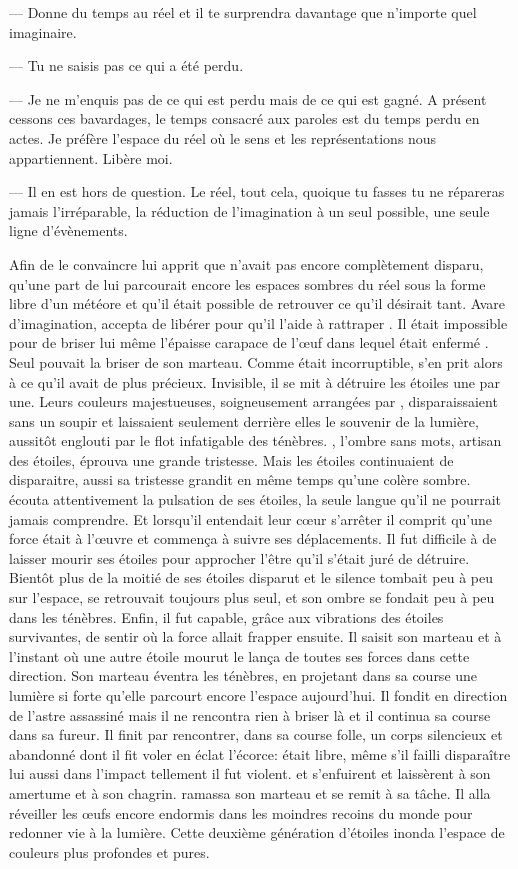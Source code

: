 --- Donne du temps au réel et il te surprendra davantage que n'importe quel imaginaire.

--- Tu ne saisis pas ce qui a été perdu. 

--- Je ne m'enquis pas de ce qui est perdu mais de ce qui est gagné. A présent cessons ces bavardages, le temps consacré aux paroles est du temps perdu en actes. Je préfère l'espace du réel où le sens et les représentations nous appartiennent. Libère moi.

--- Il en est hors de question. Le réel, tout cela, quoique tu fasses tu ne répareras jamais l'irréparable, la réduction de l'imagination à un seul possible, une seule ligne d'évènements.

Afin de le convaincre \Ogo lui apprit que \Mey n'avait pas encore complètement disparu, qu'une part de lui parcourait encore les espaces sombres du réel sous la forme libre d'un météore et qu'il était possible de retrouver ce qu'il désirait tant. Avare d'imagination, \Shuru accepta de libérer \Ogo pour qu'il l'aide à rattraper \Drisst. Il était impossible pour \Shuru de briser lui même l'épaisse carapace de l'œuf dans lequel était enfermé \Ogo. Seul \Carac pouvait la briser de son marteau. Comme \Carac était incorruptible, \Shuru s'en prit alors à ce qu'il avait de plus précieux. Invisible, il se mit à détruire les étoiles une par une. Leurs couleurs majestueuses, soigneusement arrangées par \Carac, disparaissaient sans un soupir et laissaient seulement derrière elles le souvenir de la lumière, aussitôt englouti par le flot infatigable des ténèbres. \Carac, l'ombre sans mots, artisan des étoiles, éprouva une grande tristesse. Mais les étoiles continuaient de disparaitre, aussi sa tristesse grandit en même temps qu'une colère sombre. \Carac écouta attentivement la pulsation de ses étoiles, la seule langue qu'il ne pourrait jamais comprendre. Et lorsqu'il entendait leur cœur s'arrêter il comprit qu'une force était à l'œuvre et commença à suivre ses déplacements. Il fut difficile à \Carac de laisser mourir ses étoiles pour approcher l'être qu'il s'était juré de détruire. Bientôt plus de la moitié de ses étoiles disparut et le silence tombait peu à peu sur l'espace, \Carac se retrouvait toujours plus seul, et son ombre se fondait peu à peu dans les ténèbres. Enfin, il fut capable, grâce aux vibrations des étoiles survivantes, de sentir où la force allait frapper ensuite. Il saisit son marteau et à l'instant où une autre étoile mourut le lança de toutes ses forces dans cette direction. Son marteau éventra les ténèbres, en projetant dans sa course une lumière si forte qu'elle parcourt encore l'espace aujourd'hui. Il fondit en direction de l'astre assassiné mais il ne rencontra rien à briser là et il continua sa course dans sa fureur. Il finit par rencontrer, dans sa course folle, un corps silencieux et abandonné dont il fit voler en éclat l'écorce: \Ogo était libre, même s'il failli disparaître lui aussi dans l'impact tellement il fut violent. \Ogo et \Shuru s'enfuirent et laissèrent \Carac à son amertume et à son chagrin. \Carac ramassa son marteau et se remit à sa tâche. Il alla réveiller les œufs encore endormis dans les moindres recoins du monde pour redonner vie à la lumière. Cette deuxième génération d'étoiles inonda l'espace de couleurs plus profondes et pures. 

